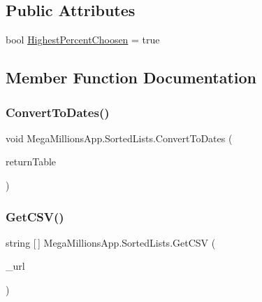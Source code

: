 \subsection*{Public Attributes}
\begin{DoxyCompactItemize}
\item 
bool \hyperlink{class_mega_millions_app_1_1_sorted_lists_a92d70560a32bbc3429f3e2c54191eb5d}{Highest\+Percent\+Choosen} = true
\end{DoxyCompactItemize}


\subsection{Member Function Documentation}
\mbox{\label{class_mega_millions_app_1_1_sorted_lists_a94dc4cadd73ec7120efd0a9408ac7612}} 
\subsubsection{\texorpdfstring{Convert\+To\+Dates()}{ConvertToDates()}}
{\footnotesize\ttfamily void Mega\+Millions\+App.\+Sorted\+Lists.\+Convert\+To\+Dates (\begin{DoxyParamCaption}\item[{Data\+Table}]{return\+Table }\end{DoxyParamCaption})}

\mbox{\label{class_mega_millions_app_1_1_sorted_lists_a502654e22b2713c20cba8c1fe96e6acb}} 
\subsubsection{\texorpdfstring{Get\+C\+S\+V()}{GetCSV()}}
{\footnotesize\ttfamily string \mbox{[}$\,$\mbox{]} Mega\+Millions\+App.\+Sorted\+Lists.\+Get\+C\+SV (\begin{DoxyParamCaption}\item[{string}]{\+\_\+url }\end{DoxyParamCaption})}


